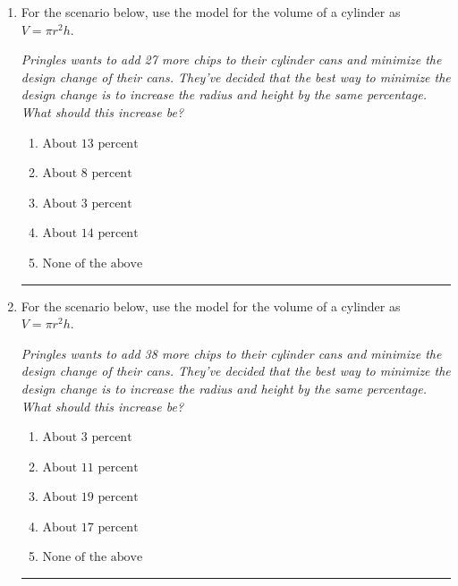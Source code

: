 \documentclass[14pt]{extbook}
\newcommand{\litem}[1]{\item#1\hspace*{-1cm}\rule{\textwidth}{0.4pt}}
\begin{document}
\begin{enumerate}
\litem{
For the scenario below, use the model for the volume of a cylinder as $V = \pi r^2 h$.
\begin{center}
    \textit{ Pringles wants to add 27 \text{percent} more chips to their cylinder cans and minimize the design change of their cans. They've decided that the best way to minimize the design change is to increase the radius and height by the same percentage. What should this increase be? }
\end{center}
\begin{enumerate}[label=\Alph*.]
\item \( \text{About } 13 \text{ percent} \)
\item \( \text{About } 8 \text{ percent} \)
\item \( \text{About } 3 \text{ percent} \)
\item \( \text{About } 14  \)
\item \( \text{None of the above} \)

\end{enumerate} }
\litem{
For the scenario below, use the model for the volume of a cylinder as $V = \pi r^2 h$.
\begin{center}
    \textit{ Pringles wants to add 38 \text{percent} more chips to their cylinder cans and minimize the design change of their cans. They've decided that the best way to minimize the design change is to increase the radius and height by the same percentage. What should this increase be? }
\end{center}
\begin{enumerate}[label=\Alph*.]
\item \( \text{About } 3 \text{ percent} \)
\item \( \text{About } 11 \text{ percent} \)
\item \( \text{About } 19 \text{ percent} \)
\item \( \text{About } 17 \text{ percent} \)
\item \( \text{None of the above} \)


\end{enumerate}}
\end{enumerate}
\end{document}
